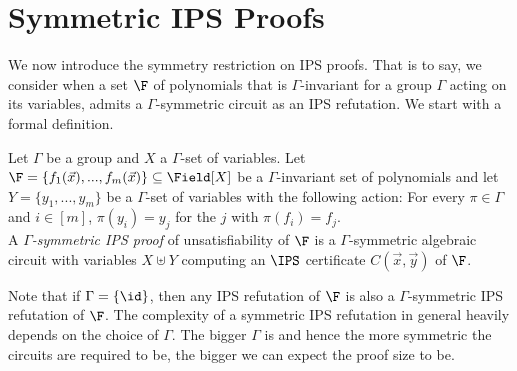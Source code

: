 \documentclass[a4paper,UKenglish,cleveref, autoref, thm-restate]{lipics-v2021}
\begin{document}
	

\section{Symmetric IPS Proofs}
\label{sec:symIPS}
We now introduce the symmetry restriction on IPS proofs.  That is to say, we consider when a set $\F$ of polynomials that is $\Gamma$-invariant for a group $\Gamma$ acting on its variables, admits a $\Gamma$-symmetric circuit as an IPS refutation.  We start with a formal definition.

\begin{definition}
	Let $\Gamma$ be a group and $X$ a $\Gamma$-set of variables. Let $\F = \{ f_1(\vec x), ..., f_m(\vec x)\}  \subseteq \Field[X]$ be a $\Gamma$-invariant set of polynomials and let $Y = \{y_1,...,y_m\}$ be a $\Gamma$-set of variables with the following action: For every $\pi \in \Gamma$ and $ i \in [m]$, $\pi(y_i) = y_j$ for the $j$ with $\pi(f_i) = f_j$.\\
	A \emph{$\Gamma$-symmetric IPS proof} of unsatisfiability of $\F$ is a $\Gamma$-symmetric algebraic circuit with variables $X \uplus Y$
	computing an $\IPS$ certificate $C(\vec x, \vec y)$ of $\F$.
\end{definition}
Note that if $\Gamma = \{\id\}$, then any IPS refutation of $\F$ is also a $\Gamma$-symmetric IPS refutation of $\F$. The complexity of a symmetric IPS refutation in general heavily depends on the choice of $\Gamma$. The bigger $\Gamma$ is and hence the more symmetric the circuits are required to be, the bigger we can expect the proof size to be.
\end{document}
